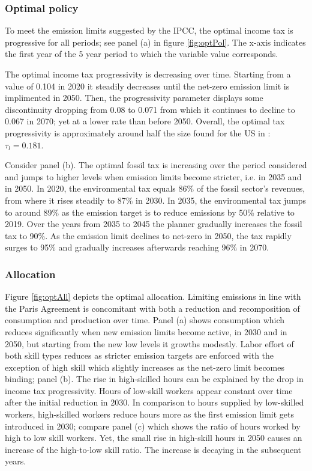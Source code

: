 \subsubsection{Optimal policy}
To meet the emission limits suggested by the IPCC, the optimal income tax is progressive for all periods; see panel (a) in figure \ref{fig:optPol}.  The x-axis indicates the first year of the 5 year period to which the variable value corresponds. 

The optimal income tax progressivity is decreasing over time. Starting from a value of 0.104 in 2020 it steadily decreases until the net-zero emission limit is implimented in 2050. Then, the progressivity parameter displays some discontinuity dropping from 0.08 to 0.071 from which it continues to decline to 0.067 in 2070; yet at a lower rate than before 2050. 
Overall, the optimal tax progressivity is approximately  around half the size found for the US in \cite{Heathcote2017OptimalFramework}: $\tau_{l}=0.181$.

Consider panel (b). The optimal fossil tax is increasing over the period considered and jumps to higher levels when emission limits become stricter, i.e. in 2035 and in 2050.
In 2020, the environmental tax equals 86\% of the fossil sector's revenues, from where it rises steadily to 87\% in 2030.  In 2035, the environmental tax jumps to around 89\% as the emission target is to reduce emissions by 50\% relative to 2019. Over the years from 2035 to 2045 the planner gradually increases the fossil tax to 90\%. As the emission limit declines to net-zero in 2050, the tax rapidly surges to 95\% and gradually increases afterwards reaching 96\% in 2070. 

\subsubsection{Allocation}
Figure \ref{fig:optAll} depicts the optimal allocation. Limiting emissions in line with the Paris Agreement is concomitant with both a reduction and recomposition of consumption and production over time. 
Panel (a) shows consumption which reduces significantly when new emission limits become active, in 2030 and in 2050, but starting from the new low levels it growths modestly. Labor effort of both skill types reduces as stricter emission targets are enforced with the exception of high skill which slightly increases as the net-zero limit becomes binding; panel (b). The rise in high-skilled hours can be explained by the drop in income tax progressivity. Hours of low-skill workers appear constant over time after the initial reduction in 2030.  In comparison to hours supplied by low-skilled workers, high-skilled workers reduce hours more as the first emission limit gets introduced in 2030; compare panel (c) which shows the ratio of hours worked by high to low skill workers. Yet, the small rise in high-skill hours in 2050 causes an increase of the high-to-low skill ratio. The increase is decaying in the subsequent years.

